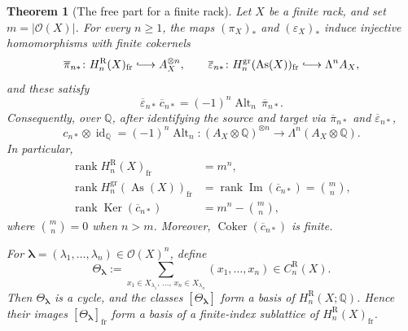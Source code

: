 \documentclass[10pt,a4paper]{amsart}
\newtheorem{theorem}{Theorem}[section]
\DeclareMathOperator{\As}{As}
\DeclareMathOperator{\rank}{rank}
\DeclareMathOperator{\Ker}{Ker}
\DeclareMathOperator{\Coker}{Coker}
\newcommand{\QQ}{\mathbb Q}
\newcommand{\OO}{\mathcal O}
\newcommand{\gr}{\mathrm{gr}}
\newcommand{\R}{\mathrm R}
\begin{document}
\begin{theorem}[The free part for a finite rack]
\label{thm:finite-rack-free-image}
Let $X$ be a finite rack, and set $m=|\OO(X)|$. For every $n\ge1$, the maps
$(\pi_X)_*$ and $(\varepsilon_X)_*$ induce injective homomorphisms with finite
cokernels
\[
 \overline\pi_{n*}\colon
 H_n^\R(X)_{\mathrm{fr}}\lhook\joinrel\longrightarrow A_X^{\otimes n},
 \qquad
 \overline\varepsilon_{n*}\colon
 H_n^{\gr}(\As(X))_{\mathrm{fr}}\lhook\joinrel\longrightarrow\Lambda^nA_X,
\]
and these satisfy
\begin{equation}
 \overline\varepsilon_{n*}\,\overline c_{n*}
 =(-1)^n\operatorname{Alt}_n\,\overline\pi_{n*}.
 \label{eq:free-part-exterior-formula}
\end{equation}
Consequently, over $\QQ$, after identifying the source and target via
$\overline\pi_{n*}$ and $\overline\varepsilon_{n*}$,
\[
 c_{n*}\otimes\operatorname{id}_{\QQ}
 =(-1)^n\operatorname{Alt}_n
 \colon
 (A_X\otimes\QQ)^{\otimes n}
 \longrightarrow
 \Lambda^n(A_X\otimes\QQ).
\]
In particular,
\[
\begin{aligned}
 \rank H_n^\R(X)_{\mathrm{fr}}&=m^n,\\
 \rank H_n^{\gr}(\As(X))_{\mathrm{fr}}
 &=\rank\operatorname{Im}(\overline c_{n*})=\binom mn,\\
 \rank\Ker(\overline c_{n*})&=m^n-\binom mn,
\end{aligned}
\]
where $\binom mn=0$ when $n>m$. Moreover,
$\Coker(\overline c_{n*})$ is finite.

For $\boldsymbol\lambda=(\lambda_1,\ldots,\lambda_n)\in\OO(X)^n$, define
\[
\Theta_{\boldsymbol\lambda}
 :=\sum_{x_1\in X_{\lambda_1},\,\ldots,\,x_n\in X_{\lambda_n}}
 (x_1,\ldots,x_n)
 \in C_n^\R(X).
\]
Then $\Theta_{\boldsymbol\lambda}$ is a cycle, and the classes
$[\Theta_{\boldsymbol\lambda}]$ form a basis of $H_n^\R(X;\QQ)$. Hence their
images $[\Theta_{\boldsymbol\lambda}]_{\mathrm{fr}}$ form a basis of a
finite-index sublattice of $H_n^\R(X)_{\mathrm{fr}}$.
\end{theorem}
\end{document}

